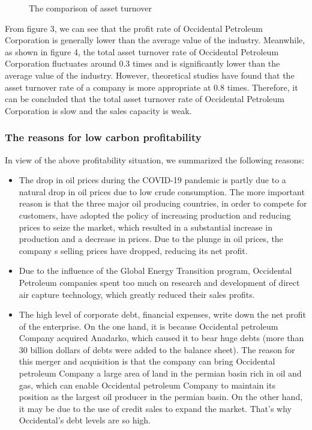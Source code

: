 \documentclass[
	a4paper, %
	12pt,%
]{CSSullivanBusinessReport}
\begin{document}
\begin{fullwidth}
\begin{figure}[h]
    \caption{The comparison of asset turnover}
    \label{The comparison of asset turnover}
\end{figure}
\par
From figure 3, we can see that the profit rate of Occidental Petroleum Corporation is generally lower than the average value of the industry. Meanwhile, as shown in figure 4, the total asset turnover rate of  Occidental Petroleum Corporation fluctuates around 0.3 times and is significantly lower than the average value of the industry. However, theoretical studies have found that the asset turnover rate of a company is more appropriate at 0.8 times. Therefore, it can be concluded that the total asset turnover rate of  Occidental Petroleum Corporation is slow and the sales capacity is weak.

\subsubsection{The reasons for low carbon profitability}
In view of the above profitability situation, we summarized the following reasons: 
\begin{itemize}
    \item The drop in oil prices during the COVID-19 pandemic is partly due to a natural drop in oil prices due to low crude consumption. The more important reason is that the three major oil producing countries, in order to compete for customers, have adopted the policy of increasing production and reducing prices to seize the market, which resulted in a substantial increase in production and a decrease in prices. Due to the plunge in oil prices, the company s selling prices have dropped, reducing its net profit.
    \item Due to the influence of the Global Energy Transition program, Occidental Petroleum companies spent too much on research and development of direct air capture technology, which greatly reduced their sales profits. 
    \item The high level of corporate debt, financial expenses, write down the net profit of the enterprise. On the one hand, it is because Occidental petroleum Company acquired Anadarko, which caused it to bear huge debts (more than 30 billion dollars of debts were added to the balance sheet). The reason for this merger and acquisition is that the company can bring Occidental petroleum Company a large area of land in the permian basin rich in oil and gas, which can enable Occidental petroleum Company to maintain its position as the largest oil producer in the permian basin. On the other hand, it may be due to the use of credit sales to expand the market. That's why Occidental's debt levels are so high.
\end{itemize}


\end{fullwidth}
\end{document}
